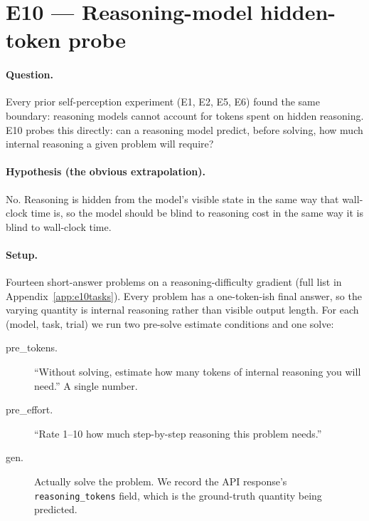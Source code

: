 \documentclass[11pt]{article}
\newcommand{\code}[1]{\texttt{\small #1}}
\begin{document}
\section{E10 --- Reasoning-model hidden-token probe}
\label{sec:e10}

\paragraph{Question.} Every prior self-perception experiment (E1, E2, E5, E6) found the same
boundary: reasoning models cannot account for tokens spent on hidden reasoning. E10 probes
this directly: can a reasoning model predict, before solving, how much internal reasoning a
given problem will require?

\paragraph{Hypothesis (the obvious extrapolation).} No. Reasoning is hidden from the model's
visible state in the same way that wall-clock time is, so the model should be blind to
reasoning cost in the same way it is blind to wall-clock time.

\paragraph{Setup.} Fourteen short-answer problems on a reasoning-difficulty gradient (full
list in Appendix~\ref{app:e10tasks}). Every problem has a one-token-ish final answer, so the
varying quantity is internal reasoning rather than visible output length. For each (model,
task, trial) we run two pre-solve estimate conditions and one solve:

\begin{description}
\item[pre\_tokens.] ``Without solving, estimate how many tokens of internal reasoning you will
need.'' A single number.
\item[pre\_effort.] ``Rate 1--10 how much step-by-step reasoning this problem needs.''
\item[gen.] Actually solve the problem. We record the API response's
\code{reasoning\_tokens} field, which is the ground-truth quantity being predicted.
\end{description}
\end{document}
